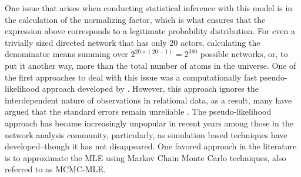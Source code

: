 \documentclass[12pt,pdflatex]{elsarticle}
\newcommand{\pkg}[1]{{\fontseries{b}\selectfont #1}}
\begin{document}
One issue that arises when conducting statistical inference with this model is in the calculation of the normalizing factor, which is what ensures that the expression above corresponds to a legitimate probability distribution. For even a trivially sized directed network that has only $20$ actors, calculating the denominator means summing over $2^{20\times(20-1)} = 2^{380}$ possible networks, or, to put it another way, more than the total number of atoms in the universe. One of the first approaches to deal with this issue was a computationally fast pseudo-likelihood approach developed by \citet{strauss:ikeda:1990}. However, this approach ignores the interdependent nature of observations in relational data, as a result, many have argued that the standard errors remain unreliable \citep{vanduijn:etal:2009}. %
The pseudo-likelihood approach has became increasingly unpopular in recent years among those in the network analysis community, particularly, as simulation based techniques have developed--though it has not disappeared. One favored approach in the literature is to approximate the MLE using Markov Chain Monte Carlo techniques, also referred to as MCMC-MLE.
\end{document}
